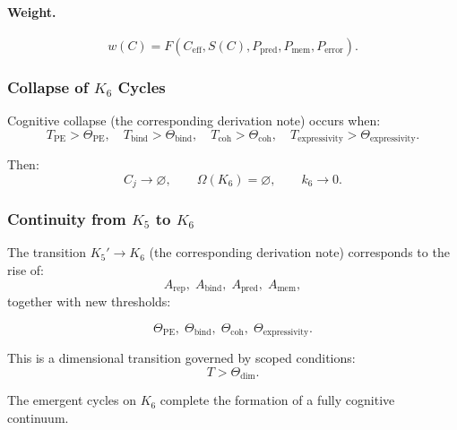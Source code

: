 \paragraph{Weight.}
\[
 w(C)
 = F(C_{\mathrm{eff}}, S(C), P_{\mathrm{pred}},
      P_{\mathrm{mem}}, P_{\mathrm{error}}).
\]

\subsubsection{Collapse of \texorpdfstring{$K_6$}{K_6} Cycles}

Cognitive collapse (the corresponding derivation note) occurs when:
\[
  T_{\mathrm{PE}}>\Theta_{\mathrm{PE}},
  \quad
  T_{\mathrm{bind}}>\Theta_{\mathrm{bind}},
  \quad
  T_{\mathrm{coh}}>\Theta_{\mathrm{coh}},
  \quad
  T_{\mathrm{expressivity}}>\Theta_{\mathrm{expressivity}}.
\]

Then:
\[
 C_j \to \varnothing,
 \qquad
 \Omega(K_6)=\varnothing,
 \qquad
 k_6\to 0.
\]

\subsubsection{Continuity from \texorpdfstring{$K_5$}{K_5} to \texorpdfstring{$K_6$}{K_6}}

The transition $K_5' \to K_6$ (the corresponding derivation note) corresponds to the rise
of:
\[
 A_{\mathrm{rep}},\;
 A_{\mathrm{bind}},\;
 A_{\mathrm{pred}},\;
 A_{\mathrm{mem}},
\]
together with new thresholds:

\[
 \Theta_{\mathrm{PE}},\;
 \Theta_{\mathrm{bind}},\;
 \Theta_{\mathrm{coh}},\;
 \Theta_{\mathrm{expressivity}}.
\]

This is a dimensional transition governed by scoped conditions:
\[
  T > \Theta_{\mathrm{dim}}.
\]

The emergent cycles on $K_6$ complete the formation of a fully cognitive continuum.
